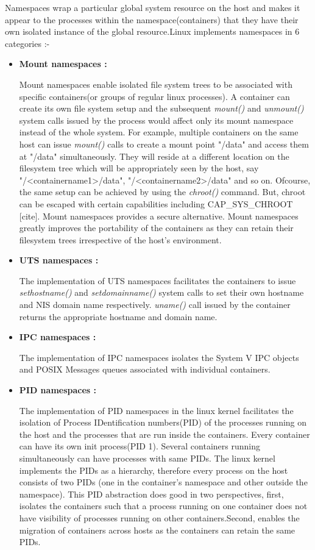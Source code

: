 Namespaces wrap a particular global system resource on the host and makes it appear to the processes within the namespace(containers) that they have their own isolated instance of the global resource.Linux implements namespaces in 6 categories :- 
\begin{itemize}
\item \textbf{Mount namespaces :}

Mount namespaces enable isolated file system trees to be associated with specific containers(or groups of regular linux processes). A container can create its own file system setup and the subsequent \textit{mount()} and \textit{unmount()} system calls issued by the process would affect only its mount namespace instead of the whole system. For example, multiple containers on the same host can issue \textit{mount()} calls to create a mount point "/data" and access them at "/data" simultaneously. They will reside at a different location on the filesystem tree which will be appropriately seen by the host, say "/\textless containername1\textgreater /data", "/\textless containername2\textgreater /data" and so on. Ofcourse, the same setup can be achieved by using the \textit{chroot()} command. But, chroot can be escaped with certain capabilities including CAP\_SYS\_CHROOT [cite]. Mount namespaces provides a secure alternative. Mount namespaces greatly improves the portability of the containers as they can retain their filesystem trees irrespective of the host's environment.


\item \textbf{UTS namespaces :}

The implementation of UTS namespaces facilitates the containers to issue \textit{sethostname()} and \textit{setdomainname()} system calls to set their own hostname and NIS domain name respectively. \textit{uname()} call issued by the container returns the appropriate hostname and domain name.


\item \textbf{IPC namespaces :}

The implementation of IPC namespaces isolates the System V IPC objects \cite{sysv_ipc} and POSIX Messages queues \cite{posix_msg_queues} associated with individual containers.


\item \textbf{PID namespaces :}

The implementation of PID namespaces in the linux kernel facilitates the isolation of Process IDentification numbers(PID) of the processes running on the host and the processes that are run inside the containers. Every container can have its own init process(PID 1). Several containers running simultaneously can have processes with same PIDs. The linux kernel implements the PIDs as a hierarchy, therefore every process on the host consists of two PIDs (one in the container's namespace and other outside the namespace). This PID abstraction does good in two perspectives, first, isolates the containers such that a process running on one container does not have visibility of processes running on other containers.Second, enables the migration of containers across hosts as the containers can retain the same PIDs.



\end{itemize}
